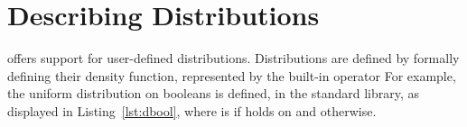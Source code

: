 %
%
%
%
%
%
%

\section{Describing Distributions\label{sec:distributions}}

\EC offers support for user-defined distributions. Distributions are defined by
formally defining their density function, represented by the built-in operator
 For example, the uniform
distribution on booleans is defined, in the standard library, as displayed in
Listing~\ref{lst:dbool}, where  is  if 
holds on  and  otherwise.

